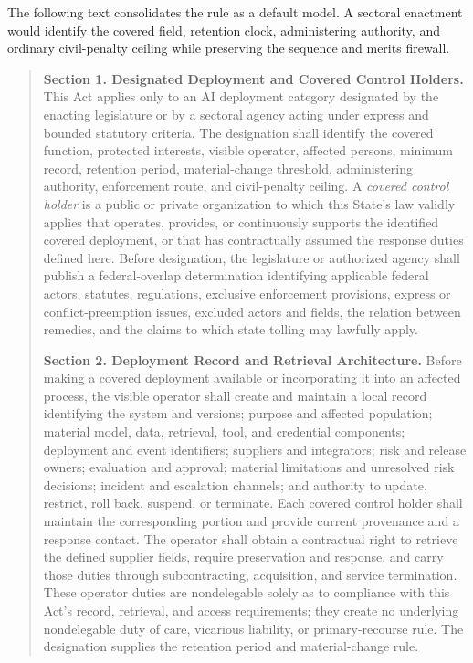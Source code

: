 The following text consolidates the rule as a default model. A sectoral enactment would identify the covered field, retention clock, administering authority, and ordinary civil-penalty ceiling while preserving the sequence and merits firewall.

\begin{quote}
\small
\textbf{Section 1. Designated Deployment and Covered Control Holders.} This Act applies only to an AI deployment category designated by the enacting legislature or by a sectoral agency acting under express and bounded statutory criteria. The designation shall identify the covered function, protected interests, visible operator, affected persons, minimum record, retention period, material-change threshold, administering authority, enforcement route, and civil-penalty ceiling. A \emph{covered control holder} is a public or private organization to which this State's law validly applies that operates, provides, or continuously supports the identified covered deployment, or that has contractually assumed the response duties defined here. Before designation, the legislature or authorized agency shall publish a federal-overlap determination identifying applicable federal actors, statutes, regulations, exclusive enforcement provisions, express or conflict-preemption issues, excluded actors and fields, the relation between remedies, and the claims to which state tolling may lawfully apply.

\textbf{Section 2. Deployment Record and Retrieval Architecture.} Before making a covered deployment available or incorporating it into an affected process, the visible operator shall create and maintain a local record identifying the system and versions; purpose and affected population; material model, data, retrieval, tool, and credential components; deployment and event identifiers; suppliers and integrators; risk and release owners; evaluation and approval; material limitations and unresolved risk decisions; incident and escalation channels; and authority to update, restrict, roll back, suspend, or terminate. Each covered control holder shall maintain the corresponding portion and provide current provenance and a response contact. The operator shall obtain a contractual right to retrieve the defined supplier fields, require preservation and response, and carry those duties through subcontracting, acquisition, and service termination. These operator duties are nondelegable solely as to compliance with this Act's record, retrieval, and access requirements; they create no underlying nondelegable duty of care, vicarious liability, or primary-recourse rule. The designation supplies the retention period and material-change rule.


\end{quote}
